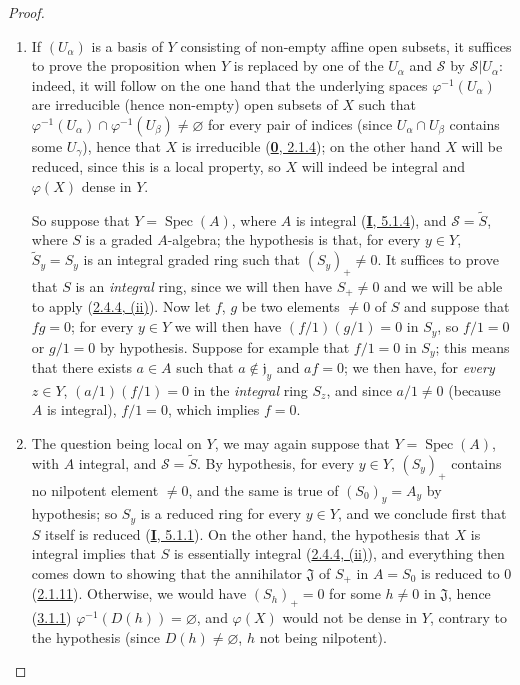 \begin{proof}
\begin{enumerate}
  \item[\rm(i)] If $(U_\alpha)$ is a basis of $Y$ consisting of non-empty
    affine open subsets, it suffices to prove the proposition when $Y$ is
    replaced by one of the $U_\alpha$ and $\mathcal{S}$ by
    $\mathcal{S}|U_\alpha$: indeed, it will follow on the one hand that the
    underlying spaces $\varphi^{-1}(U_\alpha)$ are irreducible (hence
    non-empty) open subsets of $X$ such that
    $\varphi^{-1}(U_\alpha)\cap\varphi^{-1}(U_\beta)\neq\varnothing$ for every
    pair of indices (since $U_\alpha\cap U_\beta$ contains some $U_\gamma$),
    hence that $X$ is irreducible (\hyperref[0.2.1.4]{\textbf{0}, 2.1.4}); on the
    other hand $X$ will be reduced, since this is a local property, so $X$
    will indeed be integral and $\varphi(X)$ dense in $Y$.

    So suppose that $Y=\operatorname{Spec}(A)$, where $A$ is integral
    (\hyperref[I.5.1.4]{\textbf{I}, 5.1.4}), and $\mathcal{S}=\widetilde{S}$, where
    $S$ is a graded $A$-algebra; the hypothesis is that, for every $y\in Y$,
    $\widetilde{S}_y=S_y$ is an integral graded ring such that
    $(S_y)_+\neq0$. It suffices to prove that $S$ is an \emph{integral} ring,
    since we will then have $S_+\neq0$ and we will be able to apply
    (\hyperref[II.2.4.4]{2.4.4, (ii)}). Now let $f$, $g$ be two elements
    $\neq0$ of $S$ and suppose that $fg=0$; for every $y\in Y$ we will then
    have $(f/1)(g/1)=0$ in $S_y$, so $f/1=0$ or $g/1=0$ by hypothesis.
    Suppose for example that $f/1=0$ in $S_y$; this means that there exists
    $a\in A$ such that $a\notin\mathfrak{j}_y$ and $af=0$; we then have, for
    \emph{every} $z\in Y$, $(a/1)(f/1)=0$ in the \emph{integral} ring $S_z$, and
    since $a/1\neq0$ (because $A$ is integral), $f/1=0$, which implies $f=0$.
  \item[\rm(ii)] The question being local on $Y$, we may again suppose
    that $Y=\operatorname{Spec}(A)$, with $A$ integral, and
    $\mathcal{S}=\widetilde{S}$. By hypothesis, for every $y\in Y$, $(S_y)_+$
    contains no nilpotent element $\neq0$, and the same is true of
    $(S_0)_y=A_y$ by hypothesis; so $S_y$ is a reduced ring for every
    $y\in Y$, and we conclude first that $S$ itself is reduced
    (\hyperref[I.5.1.1]{\textbf{I}, 5.1.1}). On the other hand, the hypothesis that
    $X$ is integral implies that $S$ is essentially integral
    (\hyperref[II.2.4.4]{2.4.4, (ii)}), and everything then comes down to
    showing that the annihilator $\mathfrak{J}$ of $S_+$ in $A=S_0$ is
    reduced
    to $0$
    (\hyperref[II.2.1.11]{2.1.11}). Otherwise, we would have
    $(S_h)_+=0$ for some $h\neq0$ in $\mathfrak{J}$, hence
    (\hyperref[II.3.1.1]{3.1.1}) $\varphi^{-1}(D(h))=\varnothing$, and
    $\varphi(X)$ would not be dense in $Y$, contrary to the hypothesis
    (since $D(h)\neq\varnothing$, $h$ not being nilpotent).
\end{enumerate}
\end{proof}

